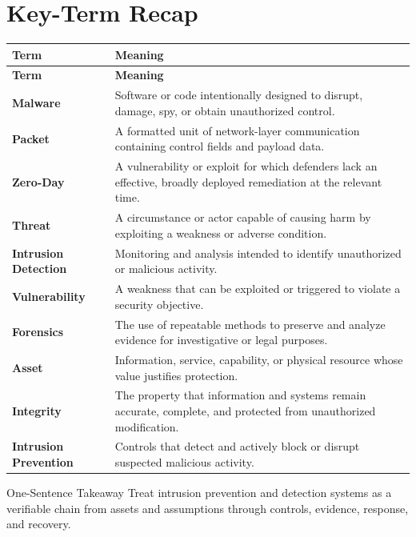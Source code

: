 \documentclass[11pt,letterpaper]{article}
\begin{document}
\section*{Key-Term Recap}
\begin{longtable}{>{\raggedright\arraybackslash}p{}>{\raggedright\arraybackslash}p{}}
\toprule\rowcolor{Navy}\color{white}\textbf{Term} & \color{white}\textbf{Meaning}\\\midrule
\endfirsthead
\toprule\rowcolor{Navy}\color{white}\textbf{Term} & \color{white}\textbf{Meaning}\\\midrule
\endhead
\textbf{Malware} & Software or code intentionally designed to disrupt, damage, spy, or obtain unauthorized control. \\\midrule
\textbf{Packet} & A formatted unit of network-layer communication containing control fields and payload data. \\\midrule
\textbf{Zero-Day} & A vulnerability or exploit for which defenders lack an effective, broadly deployed remediation at the relevant time. \\\midrule
\textbf{Threat} & A circumstance or actor capable of causing harm by exploiting a weakness or adverse condition. \\\midrule
\textbf{Intrusion Detection} & Monitoring and analysis intended to identify unauthorized or malicious activity. \\\midrule
\textbf{Vulnerability} & A weakness that can be exploited or triggered to violate a security objective. \\\midrule
\textbf{Forensics} & The use of repeatable methods to preserve and analyze evidence for investigative or legal purposes. \\\midrule
\textbf{Asset} & Information, service, capability, or physical resource whose value justifies protection. \\\midrule
\textbf{Integrity} & The property that information and systems remain accurate, complete, and protected from unauthorized modification. \\\midrule
\textbf{Intrusion Prevention} & Controls that detect and actively block or disrupt suspected malicious activity. \\\midrule
\bottomrule
\end{longtable}
\begin{CornellExamBox}{One-Sentence Takeaway}
Treat intrusion prevention and detection systems as a verifiable chain from assets and assumptions through controls, evidence, response, and recovery.
\end{CornellExamBox}
\end{document}
